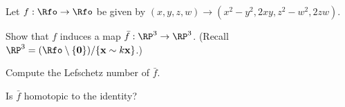 Let $f:\Rfo\rightarrow \Rfo$ be given by $(x,y,z,w)\rightarrow
(x^2-y^2,2 xy, z^2-w^2,2zw)$.
\begin{alist}
\item Show that $f$ induces a map $\bar{f}:\RP^3\rightarrow \RP^3$.
(Recall $\RP^3=(\Rfo\setminus \{\mathbf{0}\})/\{\mathbf{x}\sim
k\mathbf{x}\}$.)
\item Compute the Lefschetz number of $\bar{f}$.
\item Is $\bar{f}$ homotopic to the identity?
\end{alist}
